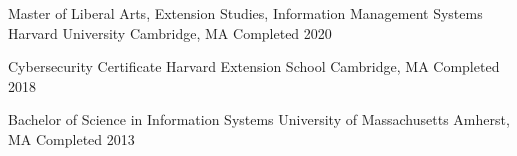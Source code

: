 
\begin{cventries}
  \cventry
    {Master of Liberal Arts, Extension Studies, Information Management Systems} %
    {Harvard University} %
    {Cambridge, MA} %
    {Completed 2020} %
    {}

  \cventry
    {Cybersecurity Certificate} %
    {Harvard Extension School} %
    {Cambridge, MA} %
    {Completed 2018} %
    {}

  \cventry
    {Bachelor of Science in Information Systems} %
    {University of Massachusetts} %
    {Amherst, MA} %
    {Completed 2013} %
    {}
  
\end{cventries}

